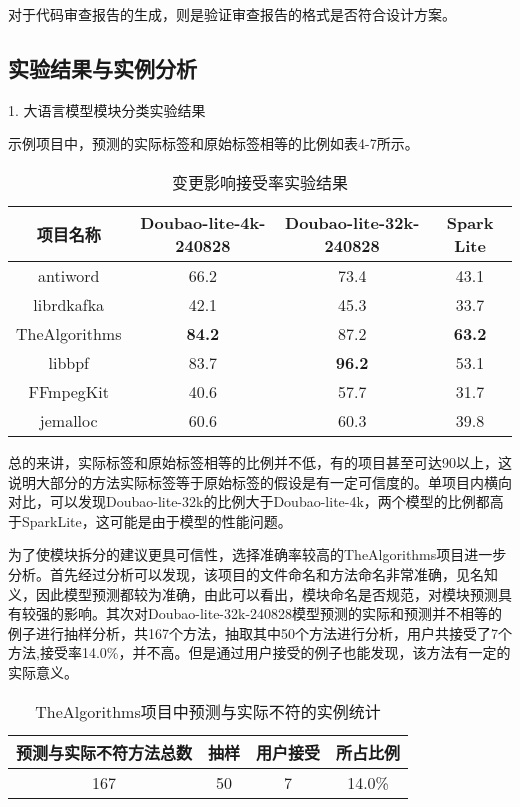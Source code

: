 对于代码审查报告的生成，则是验证审查报告的格式是否符合设计方案。

\subsection{实验结果与实例分析}

1. 大语言模型模块分类实验结果

示例项目中，预测的实际标签和原始标签相等的比例如表4-7所示。


\begin{table}[htbp]
\caption{变更影响接受率实验结果}
\vspace{0.5em}\centering\wuhao
\begin{tabular}{cccc}
\toprule
项目名称 & Doubao-lite-4k-240828 & Doubao-lite-32k-240828 & Spark Lite \\
\midrule
antiword & 66.2 & 73.4 & 43.1 \\
librdkafka & 42.1 & 45.3 & 33.7 \\
TheAlgorithms & \textbf{84.2} & 87.2 & \textbf{63.2} \\
libbpf & 83.7 & \textbf{96.2} & 53.1 \\
FFmpegKit & 40.6 & 57.7 & 31.7 \\
jemalloc & 60.6 & 60.3 & 39.8 \\
\bottomrule
\end{tabular}
\end{table}

总的来讲，实际标签和原始标签相等的比例并不低，有的项目甚至可达90以上，这说明大部分的方法实际标签等于原始标签的假设是有一定可信度的。单项目内横向对比，可以发现Doubao-lite-32k的比例大于Doubao-lite-4k，两个模型的比例都高于SparkLite，这可能是由于模型的性能问题。

为了使模块拆分的建议更具可信性，选择准确率较高的TheAlgorithms项目进一步分析。首先经过分析可以发现，该项目的文件命名和方法命名非常准确，见名知义，因此模型预测都较为准确，由此可以看出，模块命名是否规范，对模块预测具有较强的影响。其次对Doubao-lite-32k-240828模型预测的实际和预测并不相等的例子进行抽样分析，共167个方法，抽取其中50个方法进行分析，用户共接受了7个方法,接受率14.0\%，并不高。但是通过用户接受的例子也能发现，该方法有一定的实际意义。

\begin{table}[htbp]
\caption{TheAlgorithms项目中预测与实际不符的实例统计}
\vspace{0.5em}\centering\wuhao
\begin{tabular}{cccc}
\toprule
预测与实际不符方法总数 & 抽样 & 用户接受 & 所占比例 \\
\midrule
167 & 50 & 7 & 14.0\% \\
\bottomrule
\end{tabular}
\end{table}


